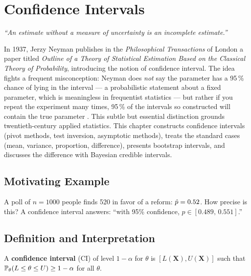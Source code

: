 \chapter{Confidence Intervals}
\label{ch:ci}

\begin{center}
\textit{``An estimate without a measure of uncertainty is an incomplete estimate.''}
\end{center}

In 1937, Jerzy Neyman publishes in the \emph{Philosophical Transactions} of London a paper titled \emph{Outline of a Theory of Statistical Estimation Based on the Classical Theory of Probability}, introducing the notion of confidence interval. The idea fights a frequent misconception: Neyman does \emph{not} say \og the parameter has a 95\,\% chance of lying in the interval \fg{} --- a probabilistic statement about a fixed parameter, which is meaningless in frequentist statistics --- but rather \og if you repeat the experiment many times, 95\,\% of the intervals so constructed will contain the true parameter \fg{}. This subtle but essential distinction grounds twentieth-century applied statistics. This chapter constructs confidence intervals (pivot methods, test inversion, asymptotic methods), treats the standard cases (mean, variance, proportion, difference), presents bootstrap intervals, and discusses the difference with Bayesian credible intervals.

\section{Motivating Example}

A poll of $n=1000$ people finds 520 in favor of a reform: $\hat{p}=0.52$. How precise is this? A confidence interval answers: ``with 95\% confidence, $p\in[0.489,\,0.551]$.''

\section{Definition and Interpretation}

\begin{definition}
A \textbf{confidence interval} (CI) of level $1-\alpha$ for $\theta$ is $[L(\mathbf{X}),U(\mathbf{X})]$ such that $\mathbb{P}_\theta(L\leq\theta\leq U)\geq 1-\alpha$ for all $\theta$.
\end{definition}

